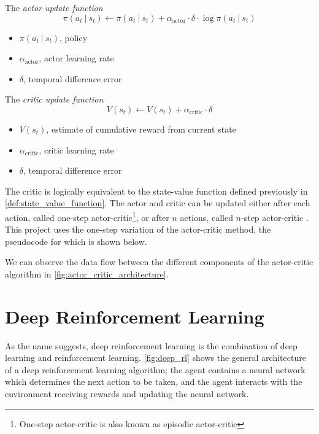 \begin{definition} \label{def:actor_update}
  The \textit{actor update function}
  $$\pi(a_t~|~s_t) \gets \pi(a_t~|~s_t) + \alpha_\text{actor}\cdot\delta\cdot\log\pi(a_t~|~s_t)$$
  \begin{itemize}[label={}]
    \item $\pi(a_t~|~s_t)$, policy
    \item $\alpha_\text{actor}$, actor learning rate
    \item $\delta$, temporal difference error
  \end{itemize}
\end{definition}

\begin{definition} \label{def:critic_update}
  The \textit{critic update function}
  $$V(s_t) \gets V(s_t) + \alpha_\text{critic}\cdot\delta$$
  \begin{itemize}[label={}]
    \item $V(s_t)$, estimate of cumulative reward from current state
    \item $\alpha_\text{critic}$, critic learning rate
    \item $\delta$, temporal difference error
  \end{itemize}
\end{definition}

The critic is logically equivalent to the state-value function defined
previously in \autoref{def:state_value_function}. The actor and critic can be
updated either after each action, called one-step
actor-critic\footnote{One-step actor-critic is also known as episodic
  actor-critic}, or after $n$ actions, called $n$-step actor-critic
\cite{sutton2018reinforcement}. This project uses the one-step variation of the
actor-critic method, the pseudocode for which is shown below.



We can observe the data flow between the different components of the
actor-critic algorithm in \autoref{fig:actor_critic_architecture}.



\section{Deep Reinforcement Learning} \label{sec:deep_rl_background}

As the name suggests, deep reinforcement learning is the combination of deep
learning and reinforcement learning. \autoref{fig:deep_rl} shows the general
architecture of a deep reinforcement learning algorithm; the agent contains a
neural network which determines the next action to be taken, and the agent
interacts with the environment receiving rewards and updating the neural
network.

